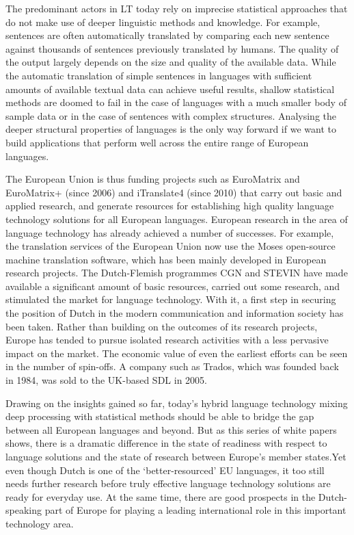 \documentclass[]{../../metanetpaper}
\begin{document}
\begin{multicols}{2}
The predominant actors in LT today rely on imprecise statistical approaches that do not make use of deeper linguistic methods and knowledge. For example, sentences are often automatically translated by comparing each new sentence against thousands of sentences previously translated by humans. The quality of the output largely depends on the size and quality of the available  data. While the automatic translation of simple sentences in languages with sufficient amounts of available textual data can achieve useful results, shallow statistical methods are doomed to fail in the case of languages with a much smaller body of sample data or in the case of sentences with complex structures. Analysing the deeper structural properties of languages is the only way forward if we want to build applications that perform well across the entire range of European languages.


The European Union is thus funding projects such as EuroMatrix and EuroMatrix+ (since 2006) and iTranslate4 (since 2010) that carry out basic and applied research, and generate resources for establishing high quality language technology solutions for all European languages.
European research in the area of language technology has already achieved a number of successes. For example, the translation services of the European Union now use the Moses open-source machine translation software, which has been mainly developed in European research projects. The Dutch-Flemish programmes CGN and STEVIN have made available a significant amount of basic resources, carried out some research, and stimulated the market for language technology. With it, a first step in securing the position of Dutch in the modern communication and information society has been taken. Rather than building on the outcomes of its research projects, Europe has tended to pursue isolated research activities with a less pervasive impact on the market. The economic value of even the earliest efforts can be seen in the number of spin-offs. A company such as Trados, which was founded back in 1984, was sold to the UK-based SDL in 2005.


Drawing on the insights gained so far, today’s hybrid language technology mixing deep processing with statistical methods should be able to bridge the gap between all European languages and beyond. But as this series of white papers shows, there is a dramatic difference in the state of readiness with respect to language solutions and the state of research between Europe’s member states.Yet even though Dutch is one of the `better-resourced' EU languages, it too still needs further research before truly effective language technology solutions are ready for everyday use. At the same time, there are good prospects in the Dutch-speaking part of Europe for playing a leading international role in this important technology area.


\end{multicols}
\end{document}
